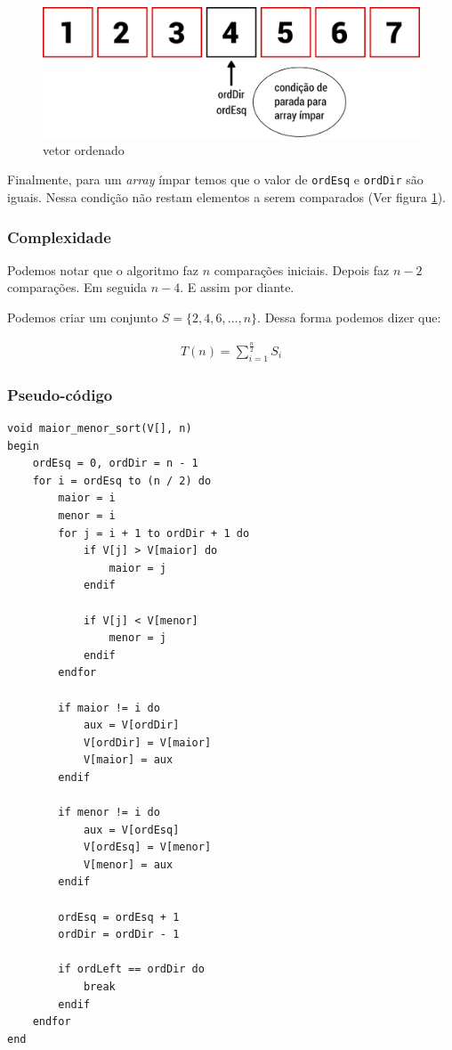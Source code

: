 \begin{figure}[h]
   \includegraphics[scale=0.6]{img/maior.menor.algoritmo/passo7.png}
   \caption{vetor ordenado}
   \label{fig:passo7}
\end{figure}

Finalmente, para um \emph{array} ímpar temos que o valor de
\texttt{ordEsq} e \texttt{ordDir} são iguais. Nessa condição não restam
elementos a serem comparados (Ver figura \ref{fig:passo7}).

\subsubsection{Complexidade}

Podemos notar que o algoritmo faz $n$ comparações iniciais. Depois faz
$n - 2$ comparações. Em seguida $n - 4$. E assim por diante.

Podemos criar um conjunto $S = \{2, 4, 6, \dots, n\}$. Dessa forma
podemos dizer que:

\begin{eqnarray*}
T(n) = \sum_{i = 1}^{\frac{n}{2}} S_i
\end{eqnarray*}

\subsubsection{Pseudo-código}

\begin{verbatim}
void maior_menor_sort(V[], n)
begin
    ordEsq = 0, ordDir = n - 1
    for i = ordEsq to (n / 2) do
        maior = i
        menor = i
        for j = i + 1 to ordDir + 1 do
            if V[j] > V[maior] do
                maior = j
            endif

            if V[j] < V[menor]
                menor = j
            endif
        endfor

        if maior != i do
            aux = V[ordDir]
            V[ordDir] = V[maior]
            V[maior] = aux
        endif

        if menor != i do
            aux = V[ordEsq]
            V[ordEsq] = V[menor]
            V[menor] = aux
        endif

        ordEsq = ordEsq + 1
        ordDir = ordDir - 1

        if ordLeft == ordDir do
            break
        endif
    endfor
end
\end{verbatim}
